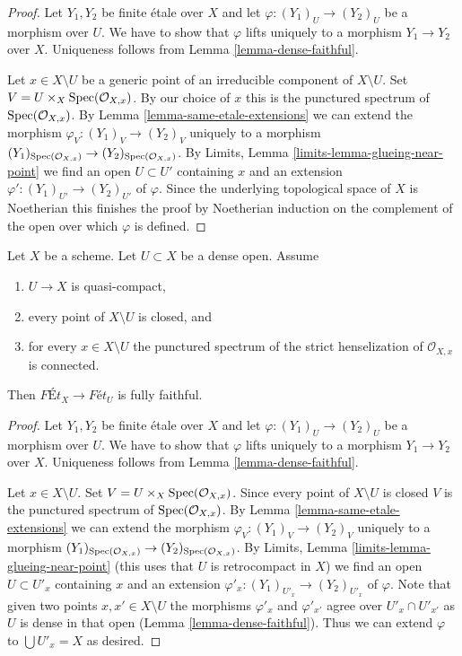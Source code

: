 \begin{proof}
Let $Y_1, Y_2$ be finite \'etale over $X$ and let
$\varphi : (Y_1)_U \to (Y_2)_U$ be a morphism over $U$. We have to show that
$\varphi$ lifts uniquely to a morphism $Y_1 \to Y_2$ over $X$.
Uniqueness follows from Lemma \ref{lemma-dense-faithful}.

\medskip\noindent
Let $x \in X \setminus U$ be a generic point of an irreducible component
of $X \setminus U$. Set $V = U \times_X \mathop{\mathrm{Spec}}(\mathcal{O}_{X, x})$.
By our choice of $x$ this is the punctured spectrum of
$\mathop{\mathrm{Spec}}(\mathcal{O}_{X, x})$. By
Lemma \ref{lemma-same-etale-extensions}
we can extend the morphism $\varphi_V : (Y_1)_V \to (Y_2)_V$
uniquely to a morphism
$(Y_1)_{\mathop{\mathrm{Spec}}(\mathcal{O}_{X, x})} \to (Y_2)_{\mathop{\mathrm{Spec}}(\mathcal{O}_{X, x})}$.
By Limits, Lemma \ref{limits-lemma-glueing-near-point}
we find an open $U \subset U'$ containing $x$ and an extension
$\varphi' : (Y_1)_{U'} \to (Y_2)_{U'}$ of $\varphi$.
Since the underlying topological space of $X$ is Noetherian
this finishes the proof by Noetherian induction on the complement
of the open over which $\varphi$ is defined.
\end{proof}

\begin{lemma}
\label{lemma-retrocompact-dense-open-connected-at-infinity-closed}
Let $X$ be a scheme. Let $U \subset X$ be a dense open. Assume
\begin{enumerate}
\item $U \to X$ is quasi-compact,
\item every point of $X \setminus U$ is closed, and
\item for every $x \in X \setminus U$ the punctured spectrum of the
strict henselization of $\mathcal{O}_{X, x}$ is connected.
\end{enumerate}
Then $\textit{F\'Et}_X \to \textit{F\'et}_U$ is fully faithful.
\end{lemma}

\begin{proof}
Let $Y_1, Y_2$ be finite \'etale over $X$ and let
$\varphi : (Y_1)_U \to (Y_2)_U$ be a morphism over $U$. We have to show that
$\varphi$ lifts uniquely to a morphism $Y_1 \to Y_2$ over $X$.
Uniqueness follows from Lemma \ref{lemma-dense-faithful}.

\medskip\noindent
Let $x \in X \setminus U$. Set $V = U \times_X \mathop{\mathrm{Spec}}(\mathcal{O}_{X, x})$.
Since every point of $X \setminus U$ is closed $V$ is the punctured spectrum
of $\mathop{\mathrm{Spec}}(\mathcal{O}_{X, x})$. By
Lemma \ref{lemma-same-etale-extensions}
we can extend the morphism $\varphi_V : (Y_1)_V \to (Y_2)_V$
uniquely to a morphism
$(Y_1)_{\mathop{\mathrm{Spec}}(\mathcal{O}_{X, x})} \to (Y_2)_{\mathop{\mathrm{Spec}}(\mathcal{O}_{X, x})}$.
By Limits, Lemma \ref{limits-lemma-glueing-near-point}
(this uses that $U$ is retrocompact in $X$)
we find an open $U \subset U'_x$ containing $x$ and an extension
$\varphi'_x : (Y_1)_{U'_x} \to (Y_2)_{U'_x}$ of $\varphi$.
Note that given two points $x, x' \in X \setminus U$ the
morphisms $\varphi'_x$ and $\varphi'_{x'}$ agree over
$U'_x \cap U'_{x'}$ as $U$ is dense in that open
(Lemma \ref{lemma-dense-faithful}). Thus we can extend $\varphi$
to $\bigcup U'_x = X$ as desired.
\end{proof}

